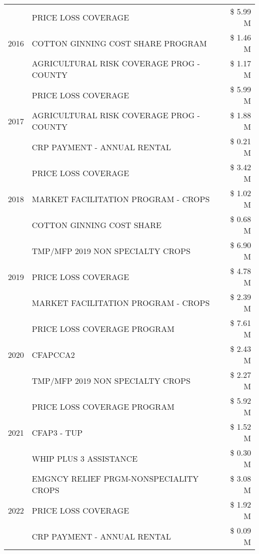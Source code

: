 \begin{tabular}{llr}
\cline{1-3}
\multirow[t]{3}{*}{2016} & PRICE LOSS COVERAGE & \$ 5.99 M \\
 & COTTON GINNING COST SHARE PROGRAM & \$ 1.46 M \\
 & AGRICULTURAL RISK COVERAGE PROG - COUNTY & \$ 1.17 M \\
\cline{1-3}
\multirow[t]{3}{*}{2017} & PRICE LOSS COVERAGE & \$ 5.99 M \\
 & AGRICULTURAL RISK COVERAGE PROG - COUNTY & \$ 1.88 M \\
 & CRP PAYMENT - ANNUAL RENTAL & \$ 0.21 M \\
\cline{1-3}
\multirow[t]{3}{*}{2018} & PRICE LOSS COVERAGE & \$ 3.42 M \\
 & MARKET FACILITATION PROGRAM - CROPS & \$ 1.02 M \\
 & COTTON GINNING COST SHARE & \$ 0.68 M \\
\cline{1-3}
\multirow[t]{3}{*}{2019} & TMP/MFP 2019 NON SPECIALTY CROPS & \$ 6.90 M \\
 & PRICE LOSS COVERAGE & \$ 4.78 M \\
 & MARKET FACILITATION PROGRAM - CROPS & \$ 2.39 M \\
\cline{1-3}
\multirow[t]{3}{*}{2020} & PRICE LOSS COVERAGE PROGRAM & \$ 7.61 M \\
 & CFAPCCA2 & \$ 2.43 M \\
 & TMP/MFP 2019 NON SPECIALTY CROPS & \$ 2.27 M \\
\cline{1-3}
\multirow[t]{3}{*}{2021} & PRICE LOSS COVERAGE PROGRAM & \$ 5.92 M \\
 & CFAP3 - TUP & \$ 1.52 M \\
 & WHIP PLUS 3 ASSISTANCE & \$ 0.30 M \\
\cline{1-3}
\multirow[t]{3}{*}{2022} & EMGNCY RELIEF PRGM-NONSPECIALITY CROPS & \$ 3.08 M \\
 & PRICE LOSS COVERAGE & \$ 1.92 M \\
 & CRP PAYMENT - ANNUAL RENTAL & \$ 0.09 M \\
\cline{1-3}
\bottomrule
\end{tabular}
